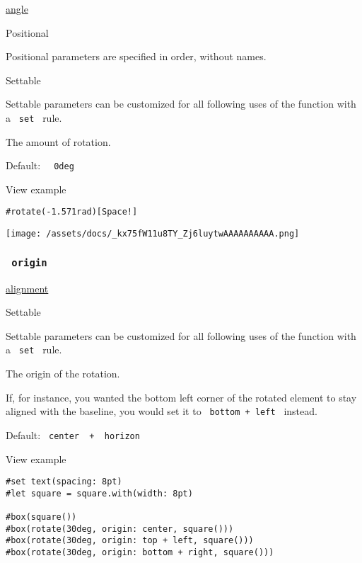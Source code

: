 \href{/docs/reference/layout/angle/}{angle}

{{ Positional }}

\label{parameters-angle-positional-tooltip}
Positional parameters are specified in order, without names.

{{ Settable }}

\label{parameters-angle-settable-tooltip}
Settable parameters can be customized for all following uses of the
function with a \texttt{\ set\ } rule.

The amount of rotation.

Default: \texttt{\ }{\texttt{\ 0deg\ }}\texttt{\ }


View example

\begin{verbatim}
#rotate(-1.571rad)[Space!]
\end{verbatim}

\texttt{[image: /assets/docs/\_kx75fW11u8TY\_Zj6luytwAAAAAAAAAA.png]}

\subsubsection{\texorpdfstring{\texttt{\ origin\ }}{ origin }}\label{parameters-origin}

\href{/docs/reference/layout/alignment/}{alignment}

{{ Settable }}

\label{parameters-origin-settable-tooltip}
Settable parameters can be customized for all following uses of the
function with a \texttt{\ set\ } rule.

The origin of the rotation.

If, for instance, you wanted the bottom left corner of the rotated
element to stay aligned with the baseline, you would set it to
\texttt{\ bottom\ +\ left\ } instead.

Default: \texttt{\ center\ }{\texttt{\ +\ }}\texttt{\ horizon\ }


View example

\begin{verbatim}
#set text(spacing: 8pt)
#let square = square.with(width: 8pt)

#box(square())
#box(rotate(30deg, origin: center, square()))
#box(rotate(30deg, origin: top + left, square()))
#box(rotate(30deg, origin: bottom + right, square()))
\end{verbatim}

